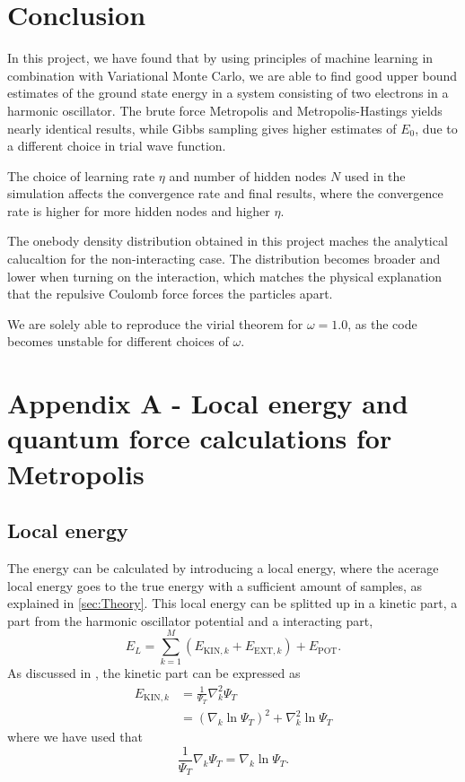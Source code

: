 \documentclass[norsk,a4paper,12pt]{article}
\begin{document}
\section{Conclusion} \label{sec:Conclusion} 
In this project, we have found that by using principles of machine learning in combination with Variational Monte Carlo, we are able to find good upper bound estimates of the ground state energy in a system consisting of two electrons in a harmonic oscillator. The brute force Metropolis and Metropolis-Hastings yields nearly identical results, while Gibbs sampling gives higher estimates of $E_0$, due to a different choice in trial wave function. 
\par 
\vspace{3mm}
The choice of learning rate $\eta$ and number of hidden nodes $N$ used in the simulation affects the convergence rate and final results, where the convergence rate is higher for more hidden nodes and higher  $\eta$. 
\par 
\vspace{3mm}
The onebody density distribution obtained in this project maches the analytical calucaltion for the non-interacting case. The distribution becomes broader and lower when turning on the interaction, which matches the physical explanation that the repulsive Coulomb force forces the particles apart.
\par
\vspace{3mm}
We are solely able to reproduce the virial theorem for $\omega=1.0$, as the code becomes unstable for different choices of $\omega$.


\newpage

\section{Appendix A - Local energy and quantum force calculations for Metropolis} \label{sec:appendix_A}

\subsection{Local energy}

The energy can be calculated by introducing a local energy, where the acerage local energy goes to the true energy with a sufficient amount of samples, as explained in \ref{sec:Theory}. This local energy can be splitted up in a kinetic part, a part from the harmonic oscillator potential and a interacting part,
\begin{equation}
E_L=\sum_{k=1}^{M}(E_{\text{KIN},k} + E_{\text{EXT},k})+E_{\text{POT}}.
\end{equation}
As discussed in \cite{Nordhagen}, the kinetic part can be expressed as
\begin{align}
E_{\text{KIN},k}&=\frac{1}{\Psi_T}\nabla_k^2\Psi_T\\
&=(\nabla_k\ln\Psi_T)^2+\nabla_k^2\ln\Psi_T
\end{align}
where we have used that
\begin{equation}
\frac{1}{\Psi_T}\nabla_k\Psi_T=\nabla_k\ln\Psi_T.
\end{equation}
\end{document}
